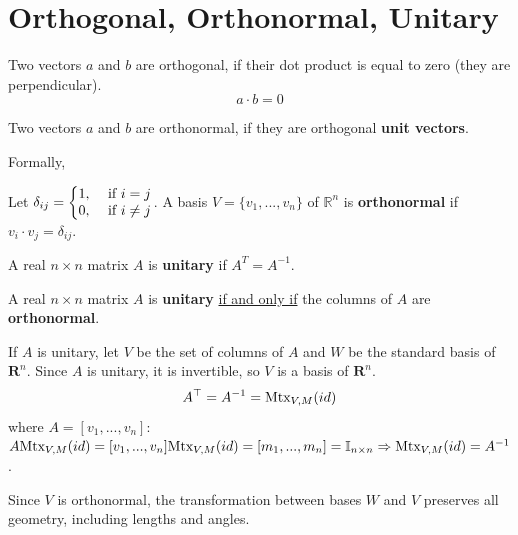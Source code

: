 \documentclass[11pt]{elegantbook}
\begin{document}
\section{Orthogonal, Orthonormal, Unitary}
Two vectors $a$ and $b$ are orthogonal, if their dot product is equal to zero (they are perpendicular). $$a\cdot b=0$$

Two vectors $a$ and $b$ are orthonormal, if they are orthogonal \textbf{unit vectors}.

Formally,
\begin{definition}[Orthonormal]
    \normalfont Let $\delta_{ij}=\left\{\begin{matrix}
        1,& \textnormal{ if }i=j\\
        0,& \textnormal{ if }i\neq j
    \end{matrix}\right.$. A basis $V = \{v_1, . . . , v_n\}$ of $\mathbb{R}^n$ is \textbf{orthonormal} if $v_i \cdot v_j = \delta_{ij}$.
\end{definition}


\begin{definition}[Unitary]
    \normalfont
    A real $n \times n$ matrix $A$ is \textbf{unitary} if $A^T=A^{-1}$.
\end{definition}


\begin{theorem}
    A real $n \times n$ matrix $A$ is \textbf{unitary} \underline{if and only if} the columns of $A$ are \textbf{orthonormal}.
\end{theorem}

If $A$ is unitary, let $V$ be the set of columns of $A$ and $W$ be the standard basis of $\mathbf{R}^n$. Since $A$ is unitary, it is invertible, so $V$ is a basis of $\mathbf{R}^n$.
$$
A^{\top}=A^{-1}=\textnormal{Mtx}_{V,M}(id)
$$
where $A=[v_1,...,v_n]$: $A\textnormal{Mtx}_{V,M}(id)=[v_1,...,v_n]\textnormal{Mtx}_{V,M}(id)=[m_1,...,m_n]=\mathbb{I}_{n\times n} \Rightarrow \textnormal{Mtx}_{V,M}(id)=A^{-1}$.

Since $V$ is orthonormal, the transformation between bases $W$ and $V$ preserves all geometry, including lengths and angles.
\end{document}
